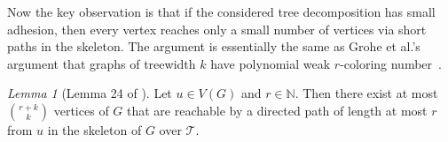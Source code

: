 \documentclass[1p,number,a4paper]{elsarticle}
\theoremstyle{remark}
\newcommand{\Tt}{\mathcal{T}}
\newcommand{\N}{\mathbb{N}}
\newtheorem{lemma}[theorem]{Lemma}
\begin{document}
Now the key observation is that if the considered tree decomposition has small adhesion, then every vertex reaches only a small number of vertices via short paths in the skeleton.
The argument is essentially the same as Grohe et al.'s argument that graphs of treewidth $k$ have polynomial weak $r$-coloring number~\cite{grohe2015colouring}.

\setcounter{claim}{0}

\begin{lemma}[Lemma 24 of \cite{pilipczuk2019polynomial}]\label{lem:skeleton-count}
Let $u\in V(G)$ and $r\in \N$. Then there exist at most $\binom{r+k}{k}$
vertices of $G$ that are reachable by a directed path of length at most $r$ from $u$ in the skeleton of $G$ over $\Tt$.
\end{lemma}
\end{document}
